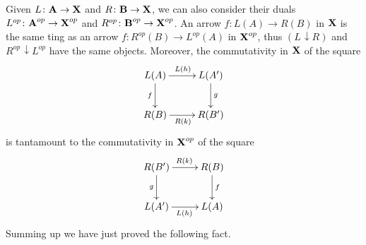 \documentclass[runningheads,envcountsect]{lipics-v2021}
\def\B{\textbf {\textup{B}}}
\def\X{\textbf {\textup{X}}}
\def\A{\textbf {\textup{A}}}
\newcommand{\comma}[2]{#1\hspace{1pt} {\downarrow}#2}
\begin{document}
Given $L\colon \A\to \X$ and $R\colon \B\to \X$, we can also consider their duals $L^{op}\colon \A^{op}\to \X^{op}$ and $R^{op}\colon \B^{op}\to \X^{op}$.  An arrow $f\colon L(A)\to R(B)$ in $\X$ is the same ting as an arrow $f\colon R^{op}(B)\to L^{op}(A)$ in $\X^{op}$, thus $\left(\comma{L}{R}\right)$ and $\comma{R^{op}}{L^{op}}$ have the same objects. Moreover, the commutativity in  $\X$ of the square
\[\xymatrix@C=25pt{L(A) \ar[r]^{L(h)} \ar[d]_{f} & L(A') \ar[d]^{g}\\ R(B) \ar[r]_{R(k)}& R(B')}\]
is tantamount to the commutativity in $\X^{op}$ of the square 
\[\xymatrix@C=25pt{ R(B') \ar[d]_{g} \ar[r]^{R(k)}& R(B) \ar[d]^{f}\\ L(A') \ar[r]_{L(h)}  & L(A) }\]
Summing up we have just proved the following fact.
\end{document}
